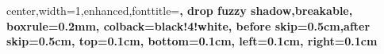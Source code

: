 

    { center,width=1\linewidth,enhanced,fonttitle=\large\bfseries,
      drop fuzzy shadow,breakable,
      boxrule=0.2mm,
      colback=black!4!white,
      before skip=0.5cm,after skip=0.5cm,
      top=0.1cm,
      bottom=0.1cm,
      left=0.1cm,
      right=0.1cm
    }

\newenvironment{columns}[1][1]{}{}
\newenvironment{column}[1]{}{}

\usepackage{titlesec}
\usepackage[dotinlabels]{titletoc}

\usepackage{float}
\makeatletter
\def\fps@figure{H}
\makeatother

\usepackage{caption}
\captionsetup[figure]{labelformat=empty}

\usepackage{rotating}
